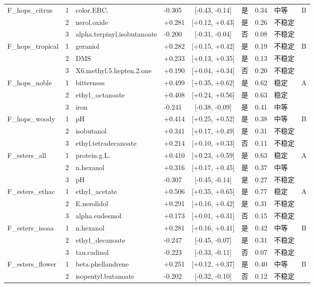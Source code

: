 {\begin{longtable}{llllcccll}
F\_hops\_citrus & 1 & color.EBC. & -0.305 & [-0.43, -0.14] & 是 & 0.34 & 中等 & B \\
 & 2 & nerol.oxide & +0.281 & [+0.12, +0.43] & 是 & 0.26 & 不稳定 &  \\
 & 3 & alpha.terpinyl.isobutanoate & -0.200 & [-0.31, -0.04] & 否 & 0.08 & 不稳定 &  \\
F\_hops\_tropical & 1 & geraniol & +0.282 & [+0.15, +0.42] & 是 & 0.19 & 不稳定 & B \\
 & 2 & DMS & +0.233 & [+0.13, +0.35] & 是 & 0.13 & 不稳定 &  \\
 & 3 & X6.methyl.5.hepten.2.one & +0.190 & [+0.04, +0.34] & 否 & 0.20 & 不稳定 &  \\
F\_hops\_noble & 1 & bitterness & +0.499 & [+0.35, +0.62] & 是 & 0.62 & 稳定 & A \\
 & 2 & ethyl\_octanoate & +0.408 & [+0.24, +0.56] & 是 & 0.63 & 稳定 &  \\
 & 3 & iron & -0.241 & [-0.38, -0.09] & 是 & 0.41 & 中等 &  \\
F\_hops\_woody & 1 & pH & +0.414 & [+0.25, +0.52] & 是 & 0.38 & 中等 & B \\
 & 2 & isobutanol & +0.341 & [+0.17, +0.49] & 是 & 0.31 & 不稳定 &  \\
 & 3 & ethyl.tetradecanoate & +0.214 & [+0.10, +0.33] & 否 & 0.11 & 不稳定 &  \\
F\_esters\_all & 1 & protein.g.L. & +0.410 & [+0.23, +0.59] & 是 & 0.63 & 稳定 & A \\
 & 2 & n.hexanol & +0.316 & [+0.17, +0.45] & 是 & 0.37 & 中等 &  \\
 & 3 & pH & -0.307 & [-0.45, -0.14] & 是 & 0.27 & 不稳定 &  \\
F\_esters\_ethac & 1 & ethyl\_acetate & +0.506 & [+0.35, +0.65] & 是 & 0.77 & 稳定 & A \\
 & 2 & E.nerolidol & +0.291 & [+0.16, +0.42] & 是 & 0.31 & 不稳定 &  \\
 & 3 & alpha.eudesmol & +0.173 & [+0.01, +0.31] & 否 & 0.15 & 不稳定 &  \\
F\_esters\_isoaa & 1 & n.hexanol & +0.281 & [+0.16, +0.41] & 是 & 0.42 & 中等 & B \\
 & 2 & ethyl\_decanoate & -0.247 & [-0.45, -0.07] & 是 & 0.31 & 不稳定 &  \\
 & 3 & tau.cadinol & -0.223 & [-0.33, -0.11] & 否 & 0.07 & 不稳定 &  \\
F\_esters\_flower & 1 & beta.phellandrene & +0.251 & [+0.12, +0.37] & 是 & 0.40 & 中等 & B \\
 & 2 & isopentyl.butanoate & -0.202 & [-0.32, -0.10] & 否 & 0.12 & 不稳定 &  \\

\end{longtable}}

